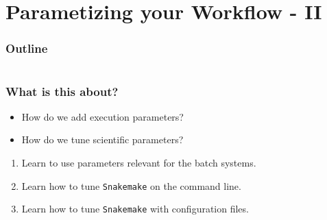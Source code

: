\section{Parametizing your Workflow - II}

\begin{frame}
    \frametitle{Outline}
    \begin{columns}[t]
        \begin{column}{.5\textwidth}
            \tableofcontents[sections={1-9},currentsection]
        \end{column}
        \begin{column}{.5\textwidth}
            \tableofcontents[sections={10-18},currentsection]
        \end{column}
    \end{columns}
\end{frame}

\begin{frame}
  \frametitle{What is this about?}
  \begin{question}[Questions]
   	\begin{itemize}
      \item How do we add execution parameters?
      \item How do we tune scientific parameters?
    \end{itemize}
  \end{question}
   \begin{docs}[Objectives]
   	 \begin{enumerate} 
        \item Learn to use parameters relevant for the batch systems.
        \item Learn how to tune \texttt{Snakemake} on the command line.
        \item Learn how to tune \texttt{Snakemake} with configuration files.
    \end{enumerate}
  \end{docs}
\end{frame}
